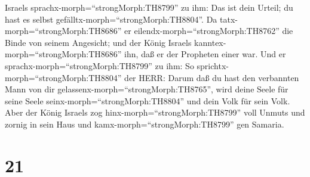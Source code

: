Israels sprachx-morph=``strongMorph:TH8799'' zu ihm: Das ist dein
Urteil; du hast es selbst gefälltx-morph=``strongMorph:TH8804''.
 Da tatx-morph=``strongMorph:TH8686'' er
eilendx-morph=``strongMorph:TH8762'' die Binde von seinem Angesicht; und
der König Israels kanntex-morph=``strongMorph:TH8686'' ihn, daß er der
Propheten einer war.  Und er
sprachx-morph=``strongMorph:TH8799'' zu ihm: So
sprichtx-morph=``strongMorph:TH8804'' der HERR: Darum daß du hast den
verbannten Mann von dir gelassenx-morph=``strongMorph:TH8765'', wird
deine Seele für seine Seele seinx-morph=``strongMorph:TH8804'' und dein
Volk für sein Volk.  Aber der König Israels zog
hinx-morph=``strongMorph:TH8799'' voll Unmuts und zornig in sein Haus
und kamx-morph=``strongMorph:TH8799'' gen Samaria.

\hypertarget{section-20}{%
\section{21}\label{section-20}}

